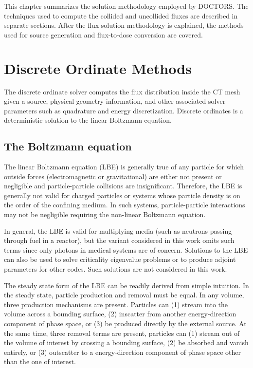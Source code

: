 
This chapter summarizes the solution methodology employed by DOCTORS. The techniques used to compute the collided and uncollided fluxes are described in separate sections. After the flux solution methodology is explained, the methods used for source generation and flux-to-dose conversion are covered.

\section{Discrete Ordinate Methods}

The discrete ordinate solver computes the flux distribution inside the CT mesh given a source, physical geometry information, and other associated solver parameters such as quadrature and energy discretization. Discrete ordinates is a deterministic solution to the linear Boltzmann equation.

\subsection{The Boltzmann equation}\label{sec:lbe}

The linear Boltzmann equation (LBE) is generally true of any particle for which outside forces (electromagnetic or gravitational) are either not present or negligible and particle-particle collisions are insignificant. Therefore, the LBE is generally not valid for charged particles or systems whose particle density is on the order of the confining medium. In such systems, particle-particle interactions may not be negligible requiring the non-linear Boltzmann equation.

In general, the LBE is valid for multiplying media (such as neutrons passing through fuel in a reactor), but the variant considered in this work omits such terms since only photons in medical systems are of concern. Solutions to the LBE can also be used to solve criticality eigenvalue problems or to produce adjoint parameters for other codes. Such solutions are not considered in this work.

The steady state form of the LBE can be readily derived from simple intuition. In the steady state, particle production and removal must be equal. In any volume, three production mechanisms are present. Particles can (1) stream into the volume across a bounding surface, (2) inscatter from another energy-direction component of phase space, or (3) be produced directly by the external source. At the same time, three removal terms are present, particles can (1) stream out of the volume of interest by crossing a bounding surface, (2) be absorbed and vanish entirely, or (3) outscatter to a energy-direction component of phase space other than the one of interest.


